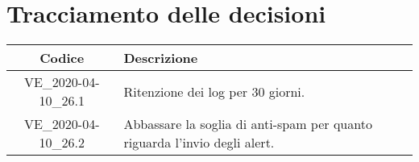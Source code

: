 \section*{Tracciamento delle decisioni}

\begin{center}
	\begin{longtable}{|c|p{12.25cm}|}
	\hline
	\rowcolor{lighter-grayer}
	\textbf{Codice} & \textbf{Descrizione} \\
	\hline
	\endfirsthead

	\hline
	VE\_2020-04-10\_26.1 & Ritenzione dei log per 30 giorni. \\
	VE\_2020-04-10\_26.2 & Abbassare la soglia di anti-spam per quanto riguarda l'invio degli alert. \\
	\hline

	\end{longtable}
\end{center}
